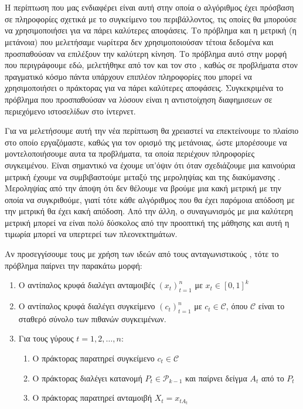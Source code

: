 \section{}
Η περίπτωση  που μας ενδιαφέρει είναι αυτή στην οποία ο αλγόριθμος έχει πρόσβαση σε πληροφορίες σχετικά με το συγκείμενο του περιβάλλοντος, τις οποίες θα μπορούσε να χρησιμοποιήσει για να πάρει καλύτερες αποφάσεις. Το πρόβλημα και η μετρική (η μετάνοια) που μελετήσαμε νωρίτερα δεν χρησιμοποιούσαν τέτοια δεδομένα και προσπαθούσαν να επιλέξουν την καλύτερη κίνηση. Το πρόβλημα αυτό στην μορφή που περιγράφουμε εδώ, μελετήθηκε από τον   και τον  στο \cite{langford_epoch-greedy_2007}, καθώς σε προβλήματα στον πραγματικό κόσμο πάντα υπάρχουν επιπλέον πληροφορίες που μπορεί να χρησιμοποιήσει ο πράκτορας για να πάρει καλύτερες αποφάσεις. Συγκεκριμένα το πρόβλημα που προσπαθούσαν να λύσουν είναι η αντιστοίχηση διαφημισεων σε περιεχόμενο ιστοσελίδων στο ίντερνετ.

Για να μελετήσουμε αυτή την νέα περίπτωση θα χρειαστεί να επεκτείνουμε το πλαίσιο στο οποίο εργαζόμαστε, καθώς για τον ορισμό της μετάνοιας, ώστε μπορέσουμε να μοντελοποιήσουμε αυτα τα προβλήματα, τα οποία περιέχουν πληροφορίες συγκειμένου. Είναι σημαντικό να έχουμε υπ'όψιν ότι όταν σχεδιάζουμε μια καινούρια μετρική έχουμε να  συμβιβαστούμε μεταξύ της μεροληψίας και της διακύμανσης . Μεροληψίας από την άποψη ότι δεν θέλουμε να βρούμε μια κακή μετρική με την οποία να συγκριθούμε, γιατί τότε κάθε αλγόριθμος που θα έχει παρόμοια απόδοση με την μετρική θα έχει κακή απόδοση. Από την άλλη, ο συναγωνισμός με μια καλύτερη μετρική μπορεί να είναι πολύ δύσκολος από την προοπτική της μάθησης και αυτή η τιμωρία μπορεί να υπερτερεί των πλεονεκτημάτων.

Αν προσεγγίσουμε τους  με χρήση των ιδεών από τους ανταγωνιστικούς , τότε το πρόβλημα παίρνει την παρακάτω μορφή:

\begin{enumerate}
    \item Ο αντίπαλος κρυφά διαλέγει ανταμοιβές $(x_t)_{t=1}^n$ με $x_t \in [0,1]^k$
    \item Ο αντίπαλος κρυφά διαλέγει συγκείμενο $(c_t)_{t=1}^n$ με $c_t \in \mathcal{C}$, όπου $\mathcal{C}$ είναι το σταθερό σύνολο των πιθανών συγκειμένων.
    \item Για τους γύρους $t=1,2,\ldots,n$:
          \begin{enumerate}
              \item Ο πράκτορας παρατηρεί συγκείμενο  $c_t \in \mathcal{C}$
              \item Ο πράκτορας διαλέγει κατανομή $P_t \in \mathcal{P}_{k-1}$ και παίρνει δείγμα $A_t$  από το $P_t$
              \item Ο πράκτορας παρατηρεί ανταμοιβή $X_t = x_{tA_t}$
          \end{enumerate}
\end{enumerate}

